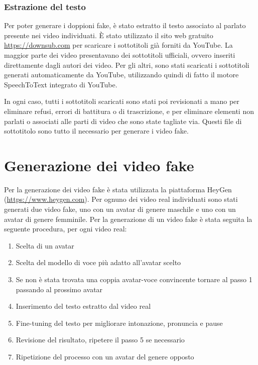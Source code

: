 \subsubsection{Estrazione del testo}
\label{sec:text_extraction}

Per poter generare i doppioni fake, è stato estratto il testo associato al parlato presente nei video individuati. È stato utilizzato il sito web gratuito \url{https://downsub.com} per scaricare i sottotitoli già forniti da YouTube. La maggior parte dei video presentavano dei sottotitoli ufficiali, ovvero inseriti direttamente dagli autori dei video. Per gli altri, sono stati scaricati i sottotitoli generati automaticamente da YouTube, utilizzando quindi di fatto il motore SpeechToText integrato di YouTube.

In ogni caso, tutti i sottotitoli scaricati sono stati poi revisionati a mano per eliminare refusi, errori di battitura o di trascrizione, e per eliminare elementi non parlati o associati alle parti di video che sono state tagliate via. Questi file di sottotitolo sono tutto il necessario per generare i video fake.

\section{Generazione dei video fake}

Per la generazione dei video fake è stata utilizzata la piattaforma HeyGen (\url{https://www.heygen.com}). Per ognuno dei video real individuati sono stati generati due video fake, uno con un avatar di genere maschile e uno con un avatar di genere femminile. Per la generazione di un video fake è stata seguita la seguente procedura, per ogni video real:

\begin{enumerate}
    \item Scelta di un avatar
    \item Scelta del modello di voce più adatto all'avatar scelto
    \item Se non è stata trovata una coppia avatar-voce convincente tornare al passo 1 passando al prossimo avatar
    \item Inserimento del testo estratto dal video real
    \item Fine-tuning del testo per migliorare intonazione, pronuncia e pause
    \item Revisione del risultato, ripetere il passo 5 se necessario
    \item Ripetizione del processo con un avatar del genere opposto
\end{enumerate}

